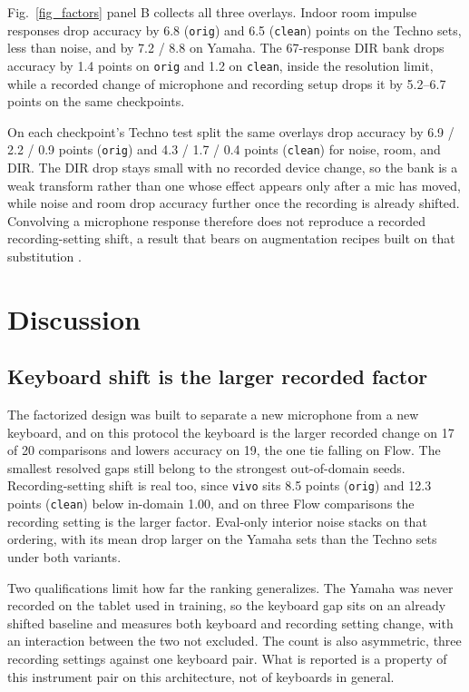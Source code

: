 \documentclass[pdflatex,sn-mathphys-num,iicol]{sn-jnl}
\begin{document}
Fig.~\ref{fig_factors} panel B collects all three overlays. Indoor room impulse responses drop accuracy by 6.8 (\texttt{orig}) and 6.5 (\texttt{clean}) points on the Techno sets, less than noise, and by 7.2 / 8.8 on Yamaha. The 67-response DIR bank drops accuracy by 1.4 points on \texttt{orig} and 1.2 on \texttt{clean}, inside the resolution limit, while a recorded change of microphone and recording setup drops it by 5.2--6.7 points on the same checkpoints.

On each checkpoint's Techno test split the same overlays drop accuracy by 6.9 / 2.2 / 0.9 points (\texttt{orig}) and 4.3 / 1.7 / 0.4 points (\texttt{clean}) for noise, room, and DIR. The DIR drop stays small with no recorded device change, so the bank is a weak transform rather than one whose effect appears only after a mic has moved, while noise and room drop accuracy further once the recording is already shifted. Convolving a microphone response therefore does not reproduce a recorded recording-setting shift, a result that bears on augmentation recipes built on that substitution \cite{Kusaka2024,Edwards2024}.

\section{Discussion}\label{sec_discussion}

\subsection{Keyboard shift is the larger recorded factor}\label{subsec_disc_keyboard}

The factorized design was built to separate a new microphone from a new keyboard, and on this protocol the keyboard is the larger recorded change on 17 of 20 comparisons and lowers accuracy on 19, the one tie falling on Flow. The smallest resolved gaps still belong to the strongest out-of-domain seeds. Recording-setting shift is real too, since \texttt{vivo} sits 8.5 points (\texttt{orig}) and 12.3 points (\texttt{clean}) below in-domain 1.00, and on three Flow comparisons the recording setting is the larger factor. Eval-only interior noise stacks on that ordering, with its mean drop larger on the Yamaha sets than the Techno sets under both variants.

Two qualifications limit how far the ranking generalizes. The Yamaha was never recorded on the tablet used in training, so the keyboard gap sits on an already shifted baseline and measures both keyboard and recording setting change, with an interaction between the two not excluded. The count is also asymmetric, three recording settings against one keyboard pair. What is reported is a property of this instrument pair on this architecture, not of keyboards in general.
\end{document}
